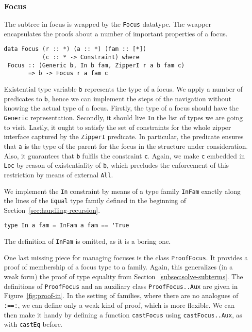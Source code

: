 \documentclass[runningheads]{llncs}
\newcommand{\K}[1]{\lstinline[style=fancy]{#1}}
\begin{document}
\subsubsection{Focus}

The subtree in focus is wrapped by the \K{Focus} datatype. 
The wrapper encapsulates the proofs about a number of important properties of a focus.
\begin{lstlisting}[style=fancy]
data Focus (r :: *) (a :: *) (fam :: [*])
           (c :: * -> Constraint) where
 Focus :: (Generic b, In b fam, ZipperI r a b fam c)
       => b -> Focus r a fam c
\end{lstlisting}
Existential type variable \K{b} represents the type of a focus. We apply a number of predicates to \K{b}, hence we can implement the steps of the navigation without knowing the actual type of a focus. Firstly, the type of a focus should have the \K{Generic} representation. Secondly, it should live \K{In} the list of types we are going to visit. Lastly, it ought to satisfy the set of constraints for the whole zipper interface captured by the \K{ZipperI} predicate. In particular, the predicate ensures that \K{a} is the type of the parent for the focus in the structure under consideration. Also, it guarantees that \K{b} fulfils the constraint \K{c}. Again, we make \K{c} embedded in \K{Loc} by reason of existentiality of \K{b}, which precludes the enforcement of this restriction by means of external \K{All}.

We implement the \K{In} constraint by means of a type family \K{InFam} exactly along the lines of the \K{Equal} type family defined in the beginning of Section~\ref{sec:handling-recursion}. 
\begin{lstlisting}[style=fancy]
type In a fam = InFam a fam == 'True
\end{lstlisting}
The definition of \K{InFam} is omitted, as it is a boring one.

One last missing piece for managing focuses is the class \K{ProofFocus}. It provides a proof of membership of a focus type to a family. Again, this generalizes (in a weak form) the proof of type equality from Section~\ref{subsec:solve-subterms}. The definitions of \K{ProofFocus} and an auxiliary class \K{ProofFocus..Aux} are given in Figure~\ref{fig:proof-in}. In the setting of families, where there are no analogues of \K{:==:}, we can define only a weak kind of proof, which is more flexible. We can then make it handy by defining a function \K{castFocus} using \K{castFocus..Aux}, as with \K{castEq} before.
\end{document}
